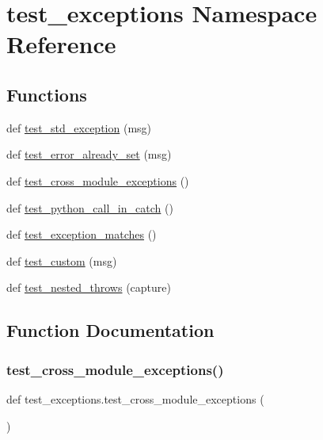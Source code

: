 \hypertarget{namespacetest__exceptions}{}\section{test\+\_\+exceptions Namespace Reference}
\label{namespacetest__exceptions}
\subsection*{Functions}
\begin{DoxyCompactItemize}
\item 
def \mbox{\hyperlink{namespacetest__exceptions_a8003f21452ee6d48d5a28cb47ae16bde}{test\+\_\+std\+\_\+exception}} (msg)
\item 
def \mbox{\hyperlink{namespacetest__exceptions_a9ea2bf30538c97fd3968669627212988}{test\+\_\+error\+\_\+already\+\_\+set}} (msg)
\item 
def \mbox{\hyperlink{namespacetest__exceptions_ae7f47864f406f18ce07b0ac482ed3054}{test\+\_\+cross\+\_\+module\+\_\+exceptions}} ()
\item 
def \mbox{\hyperlink{namespacetest__exceptions_ae6a0bbcfa4d024fd8de0e89bc1bae224}{test\+\_\+python\+\_\+call\+\_\+in\+\_\+catch}} ()
\item 
def \mbox{\hyperlink{namespacetest__exceptions_a4e0d71245eded53a1785ca21662e6143}{test\+\_\+exception\+\_\+matches}} ()
\item 
def \mbox{\hyperlink{namespacetest__exceptions_a1e734955761fef2aecda8f88fb97d0c6}{test\+\_\+custom}} (msg)
\item 
def \mbox{\hyperlink{namespacetest__exceptions_a8f1f30a6d37825f9f9b2d48b17c401e1}{test\+\_\+nested\+\_\+throws}} (capture)
\end{DoxyCompactItemize}


\subsection{Function Documentation}
\mbox{\label{namespacetest__exceptions_ae7f47864f406f18ce07b0ac482ed3054}} 
\subsubsection{\texorpdfstring{test\_cross\_module\_exceptions()}{test\_cross\_module\_exceptions()}}
{\footnotesize\ttfamily def test\+\_\+exceptions.\+test\+\_\+cross\+\_\+module\+\_\+exceptions (\begin{DoxyParamCaption}{ }\end{DoxyParamCaption})}

